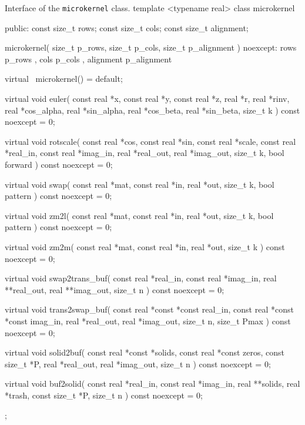 \documentclass{scrbook}
\begin{document}
\begin{cppcode}{Interface of the \lstinline|microkernel| class.}
template <typename real>
class microkernel
{
public:
    const size_t rows;
    const size_t cols;
    const size_t alignment;

    microkernel( size_t p_rows, size_t p_cols, size_t p_alignment ) noexcept:
    rows { p_rows }, cols { p_cols }, alignment { p_alignment } {}

    virtual ~microkernel() = default;

    virtual void euler( const real *x,   const real *y, const real *z,
                              real *r,         real *rinv,
                              real *cos_alpha, real *sin_alpha,
                              real *cos_beta,  real *sin_beta,
                        size_t k ) const noexcept = 0;

    virtual void rotscale( const real *cos, const real *sin, const real *scale,
                           const real *real_in,  const real *imag_in,
                                 real *real_out,       real *imag_out,
                           size_t k, bool forward ) const noexcept = 0;

    virtual void swap( const real *mat, const real *in,
                       real *out, size_t k, bool pattern ) const noexcept = 0;

    virtual void zm2l( const real *mat, const real *in, 
                       real *out, size_t k, bool pattern ) const noexcept = 0;

    virtual void zm2m( const real *mat, const real *in,
                       real *out, size_t k ) const noexcept = 0;
    
    virtual void swap2trans_buf( const real  *real_in,  const real  *imag_in,
                                       real **real_out,       real **imag_out,
                                 size_t n ) const noexcept = 0;

    virtual void trans2swap_buf( const real *const *const real_in, 
                                 const real *const *const imag_in,
                                       real *real_out, real *imag_out,
                                 size_t n, size_t Pmax ) const noexcept = 0;

    virtual void solid2buf( const real *const *solids,
                  const real *const  zeros, const size_t *P,
                  real *real_out, real *imag_out, size_t n ) const noexcept = 0;

    virtual void buf2solid( const real *real_in, const real *imag_in, 
                            real **solids, real *trash,
                            const size_t *P, size_t n ) const noexcept = 0;
};
\end{cppcode}
\end{document}
